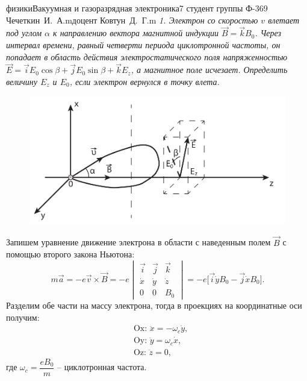 




\newcommand{\ds}{\displaystyle}


    {физики}{Вакуумная и газоразрядная электроника}{}{7}
    {студент группы Ф-369\\Чечеткин~И.~А.}{m}{доцент Ковтун~Д.~Г.}{m}
    \emph{1. Электрон со скоростью \( v \) влетает под углом \( \alpha \) к
    направлению вектора магнитной индукции \( \vec{B} = \vec{k}B_0 \). Через
    интервал времени, равный четверти периода циклотронной частоты, он попадает
    в область действия электростатического поля напряженностью
    \( \vec{E} = \vec{i}E_0\cos\beta + \vec{j}E_0\sin\beta + \vec{k}E_z \), а
    магнитное поле исчезает. Определить величину \( E_z \) и \( E_0 \), если
    электрон вернулся в точку влета.}
    \begin{figure}[h!]
        \center
        \includegraphics[width=.7\textwidth]{ch1}
    \end{figure}
    
    Запишем уравнение движение электрона в области с наведенным полем
    \( \vec{B} \) с помощью второго закона Ньютона:
    \[
        m\vec{a} = -e\vec{v}\times\vec{B} = -e
        \begin{vmatrix}
            \vec{i} & \vec{j} & \vec{k} \\
            \dot{x} & \dot{y} & \dot{z} \\
            0 & 0 & B_0
        \end{vmatrix}
        = -e\big[\vec{i}\dot{y}B_0 - \vec{j}\dot{x}B_0\big].
    \]
    Разделим обе части на массу электрона, тогда в проекциях на координатные
    оси получим:
    \begin{align}
        & \text{Ox: } \ddot{x} = -\omega_c\dot{y}, \label{eq11} \\
        & \text{Oy: } \ddot{y} = \omega_c\dot{x}, \label{eq12} \\
        & \text{Oz: } \ddot{z} = 0, \label{eq13}
    \end{align}
    где \( \omega_c = \dfrac{eB_0}{m} \) -- циклотронная частота.
    
